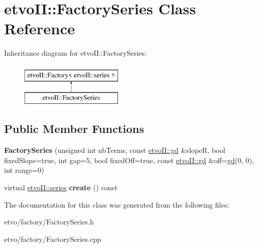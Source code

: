 \hypertarget{classetvo_i_i_1_1_factory_series}{}\section{etvo\+II\+:\+:Factory\+Series Class Reference}
\label{classetvo_i_i_1_1_factory_series}
Inheritance diagram for etvo\+II\+:\+:Factory\+Series\+:\begin{figure}[H]
\begin{center}
\leavevmode
\includegraphics[height=2.000000cm]{classetvo_i_i_1_1_factory_series}
\end{center}
\end{figure}
\subsection*{Public Member Functions}
\begin{DoxyCompactItemize}
\item 
\mbox{\label{classetvo_i_i_1_1_factory_series_a7eb04b7a5c5e842777ce132c390f2b56}} 
{\bfseries Factory\+Series} (unsigned int nb\+Terms, const \mbox{\hyperlink{classetvo_i_i_1_1gd}{etvo\+I\+I\+::gd}} \&slopeR, bool fixed\+Slope=true, int gap=5, bool fixed\+Off=true, const \mbox{\hyperlink{classetvo_i_i_1_1gd}{etvo\+I\+I\+::gd}} \&off=\mbox{\hyperlink{classetvo_i_i_1_1gd}{gd}}(0, 0), int range=0)
\item 
\mbox{\label{classetvo_i_i_1_1_factory_series_a6fe9c534f741fa3de3a56051f5ca957d}} 
virtual \mbox{\hyperlink{classetvo_i_i_1_1series}{etvo\+I\+I\+::series}} {\bfseries create} () const
\end{DoxyCompactItemize}


The documentation for this class was generated from the following files\+:\begin{DoxyCompactItemize}
\item 
etvo/factory/Factory\+Series.\+h\item 
etvo/factory/Factory\+Series.\+cpp\end{DoxyCompactItemize}
